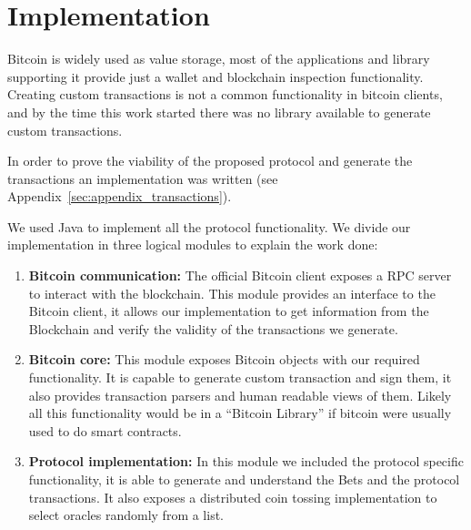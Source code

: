 \section{Implementation}

Bitcoin is widely used as value storage, most of the applications and library
  supporting it provide just a wallet and blockchain inspection functionality.
Creating custom transactions is not a common functionality in bitcoin clients,
  and by the time this work started there was no library available to generate
  custom transactions.

In order to prove the viability of the proposed protocol and generate the
  transactions an implementation
  was written (see Appendix~\ref{sec:appendix_transactions}).

We used Java to implement all the protocol functionality.
We divide our implementation in three logical modules to explain the work done:
\begin{enumerate}
\item \textbf{Bitcoin communication:}
The official Bitcoin client exposes a RPC server to interact with the
  blockchain.
This module provides an interface to the Bitcoin client, it allows our
  implementation to get information from the Blockchain and verify the
  validity of the transactions we generate.

\item \textbf{Bitcoin core:}
This module exposes Bitcoin objects with our required functionality.
It is capable to generate custom transaction and sign them, it also
  provides transaction parsers and human readable views of them.
Likely all this functionality would be in a ``Bitcoin Library'' if bitcoin
  were usually used to do smart contracts.

\item \textbf{Protocol implementation:}
In this module we included the protocol specific functionality, it is able
  to generate and understand the Bets and the protocol transactions.
It also exposes a distributed coin tossing implementation to select oracles
  randomly from a list.
\end{enumerate}

